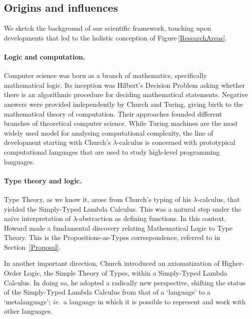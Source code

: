 \documentclass[11pt,twocolumn]{article}
\newcommand{\ie}{\emph{ie.}}
\newcommand{\lcalculus}{\mbox{$\lambda$-calculus}}
\begin{document}
\subsection{Origins and influences}
\label{Origins}

We sketch the background of our scientific framework, 
touching upon %
developments that led to the holistic conception of
Figure\,\ref{ResearchAreas}.


\paragraph*{Logic and computation.}

Computer science was born as a branch of mathematics, specifically
mathematical logic.  Its inception was Hilbert's %
Decision Problem asking whether there is an algorithmic procedure for
deciding mathematical statements.  Negative answers were provided
independently by Church %
and Turing, %
giving birth to the mathematical theory of computation.  Their approaches
founded different branches of theoretical computer science.  
While Turing machines are the most widely used model for analysing
computational complexity, the line of development starting with Church's
{\lcalculus} is concerned with prototypical computational languages that
are used to study high-level programming languages.  

\paragraph*{Type theory and logic.}
\label{SectionATypeTheoryAndLogicParagraph}

Type Theory, as we %
know it, arose from Church's typing of
his \lcalculus, that yielded the 
Simply-Typed Lambda Calculus. %
This was a natural step under the naive interpretation of
\mbox{$\lambda$-abstraction} as defining functions.  In this
context,
Howard %
made a fundamental discovery relating Mathematical Logic to Type Theory.
This is the Prop\-o\-si\-tions-as-Types correspondence, referred to
in Section~\ref{Proposal}.

In another %
important direction, Church introduced 
an axiomatization of Higher-Order Logic, the 
Simple Theory of Types, %
within a Simply-Typed Lambda Calculus.  In doing so, he adopted a
radically new perspective, shifting the status of the Simply-Typed Lambda
Calculus from that of a `language' to a `metalanguage'; \ie~a language in
which it is possible to represent and work with other languages. 
\end{document}
